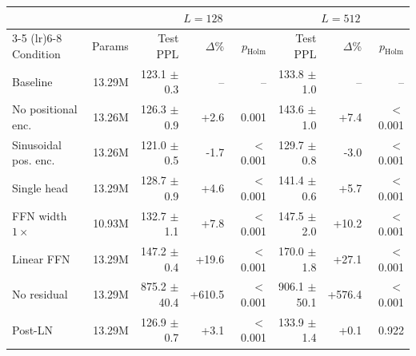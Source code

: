 \begin{tabular}{l r r r r r r r}
\toprule
 & & \multicolumn{3}{c}{$L=128$} & \multicolumn{3}{c}{$L=512$} \\
\cmidrule(lr){3-5} \cmidrule(lr){6-8}
Condition & Params & Test PPL & $\Delta$\% & $p_\mathrm{Holm}$ & Test PPL & $\Delta$\% & $p_\mathrm{Holm}$ \\
\midrule
Baseline & 13.29M & 123.1 $\pm$ 0.3 & -- & -- & 133.8 $\pm$ 1.0 & -- & -- \\
No positional enc. & 13.26M & 126.3 $\pm$ 0.9 & +2.6 & 0.001 & 143.6 $\pm$ 1.0 & +7.4 & $<$0.001 \\
Sinusoidal pos. enc. & 13.26M & 121.0 $\pm$ 0.5 & -1.7 & $<$0.001 & 129.7 $\pm$ 0.8 & -3.0 & $<$0.001 \\
Single head & 13.29M & 128.7 $\pm$ 0.9 & +4.6 & $<$0.001 & 141.4 $\pm$ 0.6 & +5.7 & $<$0.001 \\
FFN width $1\times$ & 10.93M & 132.7 $\pm$ 1.1 & +7.8 & $<$0.001 & 147.5 $\pm$ 2.0 & +10.2 & $<$0.001 \\
Linear FFN & 13.29M & 147.2 $\pm$ 0.4 & +19.6 & $<$0.001 & 170.0 $\pm$ 1.8 & +27.1 & $<$0.001 \\
No residual & 13.29M & 875.2 $\pm$ 40.4 & +610.5 & $<$0.001 & 906.1 $\pm$ 50.1 & +576.4 & $<$0.001 \\
Post-LN & 13.29M & 126.9 $\pm$ 0.7 & +3.1 & $<$0.001 & 133.9 $\pm$ 1.4 & +0.1 & 0.922 \\
\bottomrule
\end{tabular}
